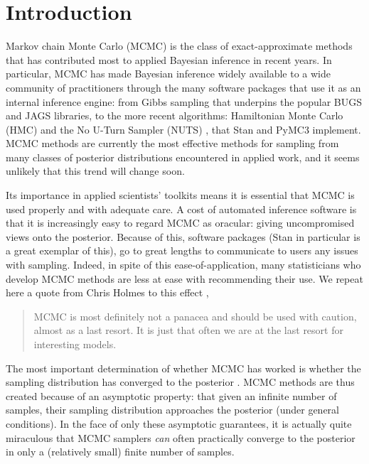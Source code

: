 \documentclass{article}
\begin{document}
\section{Introduction}
Markov chain Monte Carlo (MCMC) is the class of exact-approximate methods that has contributed most to applied Bayesian inference in recent years. In particular, MCMC has made Bayesian inference widely available to a wide community of practitioners through the many software packages that use it as an internal inference engine: from Gibbs sampling \cite{geman1984stochastic} that underpins the popular BUGS \cite{lunn2000winbugs} and JAGS \cite{plummer2003jags} libraries, to the more recent algorithms: Hamiltonian Monte Carlo (HMC) \cite{neal2011mcmc} and the No U-Turn Sampler (NUTS) \cite{hoffman2014no}, that Stan \cite{carpenter2017stan} and PyMC3 \cite{salvatier2016probabilistic} implement. MCMC methods are currently the most effective methods for sampling from many classes of posterior distributions encountered in applied work, and it seems unlikely that this trend will change soon.

Its importance in applied scientists' toolkits means it is essential that MCMC is used properly and with adequate care. A cost of automated inference software is that it is increasingly easy to regard MCMC as oracular: giving uncompromised views onto the posterior. Because of this, software packages (Stan in particular \cite{carpenter2017stan} is a great exemplar of this), go to great lengths to communicate to users any issues with sampling. Indeed, in spite of this ease-of-application, many statisticians who develop MCMC methods are less at ease with recommending their use. We repeat here a quote from Chris Holmes to this effect \cite{holmes},

\begin{quote}
	MCMC is most definitely not a panacea and should be used with caution, almost as a last resort. It is just that often we are at the last resort for interesting models.
\end{quote}

The most important determination of whether MCMC has worked is whether the sampling distribution has converged to the posterior \cite{lambert2018Student}. MCMC methods are thus created because of an asymptotic property: that given an infinite number of samples, their sampling distribution approaches the posterior (under general conditions). In the face of only these asymptotic guarantees, it is actually quite miraculous that MCMC samplers \textit{can} often practically converge to the posterior in only a (relatively small) finite number of samples.
\end{document}
